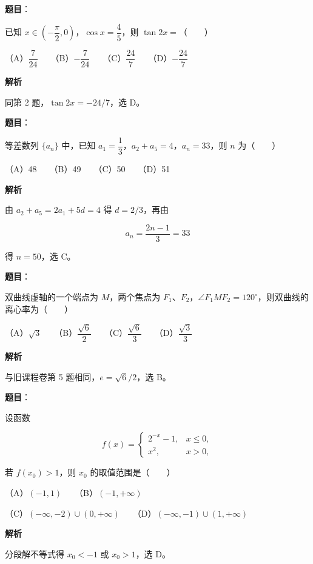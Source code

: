\begin{answer}

\textbf{题目}：

已知 $x\in\left(-\dfrac\pi2,0\right)$，$\cos x=\dfrac45$，则 $\tan2x=$\mbox{（　　）}

（A）$\dfrac7{24}$　　（B）$-\dfrac7{24}$　　（C）$\dfrac{24}{7}$　　（D）$-\dfrac{24}{7}$

\textbf{解析}

同第 2 题，$\tan2x=-24/7$，选 D。


\end{answer}
\begin{answer}

\textbf{题目}：

等差数列 $\{a_n\}$ 中，已知 $a_1=\dfrac13$，$a_2+a_5=4$，$a_n=33$，则 $n$ 为\mbox{（　　）}

（A）48　　（B）49　　（C）50　　（D）51

\textbf{解析}

由 $a_2+a_5=2a_1+5d=4$ 得 $d=2/3$，再由

\nopagebreak[4]
\[
a_n=\frac{2n-1}{3}=33
\]

得 $n=50$，选 C。


\end{answer}
\begin{answer}

\textbf{题目}：

双曲线虚轴的一个端点为 $M$，两个焦点为 $F_1\text{、}F_2$，$\angle F_1MF_2=120^\circ$，则双曲线的离心率为\mbox{（　　）}

（A）$\sqrt3$　　（B）$\dfrac{\sqrt6}{2}$　　（C）$\dfrac{\sqrt6}{3}$　　（D）$\dfrac{\sqrt3}{3}$

\textbf{解析}

与旧课程卷第 5 题相同，$e=\sqrt6/2$，选 B。


\end{answer}
\begin{answer}

\textbf{题目}：

设函数

\nopagebreak[4]
\[
f(x)=
\begin{cases}
2^{-x}-1,&x\leqslant0,\\
x^2,&x>0,
\end{cases}
\]

若 $f(x_0)>1$，则 $x_0$ 的取值范围是\mbox{（　　）}

（A）$(-1,1)$　　（B）$(-1,+\infty)$

（C）$(-\infty,-2)\cup(0,+\infty)$　　（D）$(-\infty,-1)\cup(1,+\infty)$

\textbf{解析}

分段解不等式得 $x_0<-1$ 或 $x_0>1$，选 D。


\end{answer}
